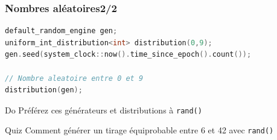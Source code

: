 \documentclass[C++.tex]{subfiles}
\begin{document}
\begin{frame}[fragile]
	\frametitle{Nombres aléatoires\titlehfill{}2/2}
	\begin{lstlisting}[language=C++]
default_random_engine gen;
uniform_int_distribution<int> distribution(0,9);
gen.seed(system_clock::now().time_since_epoch().count());

// Nombre aleatoire entre 0 et 9
distribution(gen);\end{lstlisting}

	\begin{exampleblock}{Do}
		Préférez ces générateurs et distributions à \lstinline|rand()|
	\end{exampleblock}

	\begin{block}{Quiz}
		Comment générer un tirage équiprobable entre 6 et 42 avec \lstinline|rand()|
	\end{block}
\end{frame}
\end{document}
